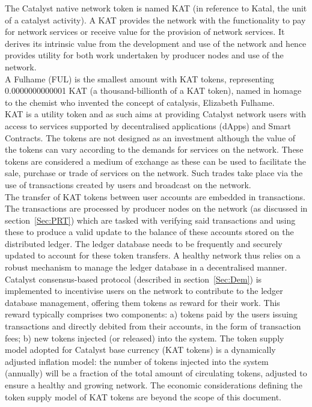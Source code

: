 The Catalyst native network token is named KAT (in reference to Katal, the unit of a catalyst activity). A KAT provides the network with the functionality to pay for network services or receive value for the provision of network services. It derives its intrinsic value from the development and use of the network and hence provides utility for both work undertaken by producer nodes and use of the network. \\

A Fulhame (FUL) is the smallest amount with KAT tokens, representing 0.0000000000001 KAT (a thousand-billionth of a KAT token), named in homage to the chemist who invented the concept of catalysis, Elizabeth Fulhame.\\

KAT is a utility token and as such aims at providing Catalyst network users with access to services supported by decentralised applications (dApps) and Smart Contracts. The tokens are not designed as an investment although the value of the tokens can vary according to the demands for services on the network. These tokens are considered a medium of exchange as these can be used to facilitate the sale, purchase or trade of services on the network. Such trades take place via the use of transactions created by users and broadcast on the network. \\

The transfer of KAT tokens between user accounts are embedded in transactions. The transactions are processed by producer nodes on the network (as discussed in section~\ref{Sec:PRT}) which are tasked with verifying said transactions and using these to produce a valid update to the balance of these accounts stored on the distributed ledger. The ledger database needs to be frequently and securely updated to account for these token transfers. A healthy network thus relies on a robust mechanism to manage the ledger database in a decentralised manner. Catalyst consensus-based protocol (described in section~\ref{Sec:Dem}) is implemented to incentivise users on the network to contribute to the ledger database management, offering them tokens as reward for their work. This reward typically comprises two components: a) tokens paid by the users issuing transactions and directly debited from their accounts, in the form of transaction fees; b) new tokens injected (or released) into the system. The token supply model adopted for Catalyst base currency (KAT tokens) is a dynamically adjusted inflation model: the number of tokens injected into the system (annually) will be a fraction of the total amount of circulating tokens, adjusted to ensure a healthy and growing network. The economic considerations defining the token supply model of KAT tokens are beyond the scope of this document. 
